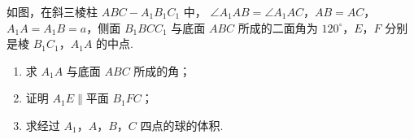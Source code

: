 \begin{problem}
如图，在斜三棱柱 \(ABC-A_1B_1C_1\) 中，
\(\angle A_1AB=\angle A_1AC\)，\(AB=AC\)，\(A_1A=A_1B=a\)，侧面
\(B_1BCC_1\) 与底面 \(ABC\) 所成的二面角为 \(120^\circ\)，\(E\)，\(F\) 分别是棱
\(B_1C_1\)，\(A_1A\) 的中点.

\begin{enumerate}
\item 求 \(A_1A\) 与底面 \(ABC\) 所成的角；
\item 证明 \(A_1E\parallel\text{平面 }B_1FC\)；
\item 求经过 \(A_1\)，\(A\)，\(B\)，\(C\) 四点的球的体积.
\end{enumerate}

\end{problem}

